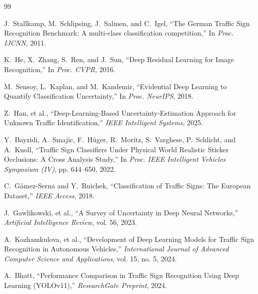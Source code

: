 \documentclass[11pt,a4paper]{article}
\begin{document}
\begin{thebibliography}{99}

J.~Stallkamp, M.~Schlipsing, J.~Salmen, and C.~Igel,
\newblock ``The German Traffic Sign Recognition Benchmark: A multi-class classification competition,''
\newblock In \emph{Proc. IJCNN}, 2011.

K.~He, X.~Zhang, S.~Ren, and J.~Sun,
\newblock ``Deep Residual Learning for Image Recognition,''
\newblock In \emph{Proc. CVPR}, 2016.

M.~Sensoy, L.~Kaplan, and M.~Kandemir,
\newblock ``Evidential Deep Learning to Quantify Classification Uncertainty,''
\newblock In \emph{Proc. NeurIPS}, 2018.

Z.~Han, et al.,
\newblock ``Deep-Learning-Based Uncertainty-Estimation Approach for Unknown Traffic Identification,''
\newblock \emph{IEEE Intelligent Systems}, 2025.

Y.~Bayzidi, A.~Smajic, F.~H{\"u}ger, R.~Moritz, S.~Varghese, P.~Schlicht, and A.~Knoll,
\newblock ``Traffic Sign Classifiers Under Physical World Realistic Sticker Occlusions: A Cross Analysis Study,''
\newblock In \emph{Proc. IEEE Intelligent Vehicles Symposium (IV)}, pp. 644--650, 2022.

C.~G{\'a}mez-Serna and Y.~Ruichek,
\newblock ``Classification of Traffic Signs: The European Dataset,''
\newblock \emph{IEEE Access}, 2018.

J.~Gawlikowski, et al.,
\newblock ``A Survey of Uncertainty in Deep Neural Networks,''
\newblock \emph{Artificial Intelligence Review}, vol. 56, 2023.

A.~Kozhamkulova, et al.,
\newblock ``Development of Deep Learning Models for Traffic Sign Recognition in Autonomous Vehicles,''
\newblock \emph{International Journal of Advanced Computer Science and Applications}, vol. 15, no. 5, 2024.

A.~Bhatt,
\newblock ``Performance Comparison in Traffic Sign Recognition Using Deep Learning (YOLOv11),''
\newblock \emph{ResearchGate Preprint}, 2024.


\end{thebibliography}
\end{document}
